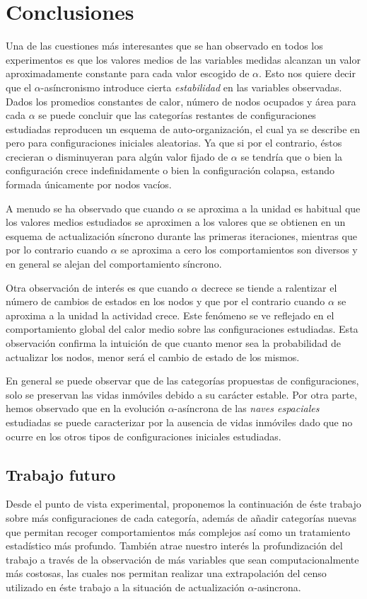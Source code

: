 \documentclass[../proyecto.tex]{memoir}
\begin{document}
\chapter{Conclusiones}

Una de las cuestiones más interesantes que se han observado en todos los experimentos es que los valores medios de las variables medidas alcanzan un valor aproximadamente constante para cada valor escogido de $\alpha$. Esto nos quiere decir que el $\alpha$-asíncronismo introduce cierta \textit{estabilidad} en las variables observadas. Dados los promedios constantes de calor, número de nodos ocupados y área para cada $\alpha$ se puede concluir que las categorías restantes de configuraciones estudiadas reproducen un esquema de auto-organización, el cual ya se describe en \cite{syncVSasync} pero para configuraciones iniciales aleatorias. Ya que si por el contrario, éstos crecieran o disminuyeran para algún valor fijado de $\alpha$ se tendría que o bien la configuración crece indefinidamente o bien la configuración colapsa, estando formada únicamente por nodos vacíos. 

A menudo se ha observado que cuando $\alpha$ se aproxima a la unidad es habitual que los valores medios estudiados se aproximen a los valores que se obtienen en un esquema de actualización síncrono durante las primeras iteraciones, mientras que por lo contrario cuando $\alpha$ se aproxima a cero los comportamientos son diversos y en general se alejan del comportamiento síncrono.

Otra observación de interés es que cuando $\alpha$ decrece se tiende a ralentizar el número de cambios de estados en los nodos y que por el contrario cuando $\alpha$ se aproxima a la unidad la actividad crece. Este fenómeno se ve reflejado en el comportamiento global del calor medio sobre las configuraciones estudiadas. Esta observación confirma la intuición de que cuanto menor sea la probabilidad de actualizar los nodos, menor será el cambio de estado de los mismos.

En general se puede observar que de las categorías propuestas de configuraciones, solo se preservan las vidas inmóviles debido a su carácter estable. Por otra parte, hemos observado que en la evolución $\alpha$-asíncrona de las \textit{naves espaciales} estudiadas se puede caracterizar por la ausencia de vidas inmóviles dado que no ocurre en los otros tipos de configuraciones iniciales estudiadas.

\section{Trabajo futuro}

Desde el punto de vista experimental, proponemos la continuación de éste trabajo sobre más configuraciones de cada categoría, además de añadir categorías nuevas que permitan recoger comportamientos más complejos así como un tratamiento estadístico más profundo. También atrae nuestro interés la profundización del trabajo a través de la observación de más variables que sean computacionalmente más costosas, las cuales nos permitan realizar una extrapolación del censo utilizado en éste trabajo a la situación de actualización $\alpha$-asincrona.
\end{document}
